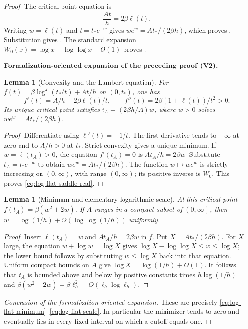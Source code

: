 \documentclass[11pt]{article}
\newtheorem{lemma}[theorem]{Lemma}
\newcommand{\formalisationparentid}{X}
\newenvironment{formalisationaddition}[1]{\par\medskip\begingroup\color{blue}\def\formalisationparentid{#1}\setcounter{formalizationsublemma}{0}\let\lemma\formalizationsublemma\let\endlemma\endformalizationsublemma
  \def\Eo{\mathcal E_h^\circ}\def\EE{\mathcal E_h}\def\phio{\phi_h^\circ}\def\phih{\phi_h}\def\Ho{H_h^{\rm atom}(v^\circ)}\def\Ha{H_h^{\rm atom}}\def\HL{H_h^{L}}\def\Dh{D_h}\def\Log{\operatorname{Log}}\def\ellh{\ell_h}\def\Gp{G_{p,h}}\def\Ast{A_{*,h}}\def\ahat{\widehat{\mathfrak a}_h}\def\ah{\mathfrak a_h}\def\rh{\widehat\rho_h}\def\deltah{\widehat\delta_h}\def\oldref##1{\textup{(##1)}}\def\interface##1{\par\noindent\textit{Analytical interface used here.} ##1\par}\def\finish{\par\noindent\textit{Conclusion of the formalization-oriented expansion.} }\par\noindent\textbf{Formalization-oriented expansion of the preceding proof (V2).}\par\smallskip
}{\par\endgroup\medskip
}
\begin{document}
\begin{proof}
The critical-point equation is
\[
 \frac{At}{h}=2\beta\ell(t).
\]
Writing $w=\ell(t)$ and $t=t_*e^{-w}$ gives
$we^w=At_*/(2\beta h)$, which proves
.  Substitution gives
.  The standard expansion
$W_0(x)=\log x-\log\log x+O(1)$ proves
.

\begin{formalisationaddition}{L2.7}
\begin{lemma}[Convexity and the Lambert equation]\label{sublemma:L2-7-stationary}
For $f(t)=\beta\log^2(t_*/t)+At/h$ on $(0,t_*)$, one has
\[
 f'(t)=A/h-2\beta\ell(t)/t,\qquad
 f''(t)=2\beta(1+\ell(t))/t^2>0.
\]
Its unique critical point satisfies $t_A=(2\beta h/A)w$, where
$w>0$ solves $we^w=At_*/(2\beta h)$.
\end{lemma}
\begin{proof}
Differentiate using $\ell'(t)=-1/t$. The first derivative tends to $-\infty$ at zero and to $A/h>0$ at $t_*$. Strict convexity gives a unique minimum. If $w=\ell(t_A)>0$, the equation $f'(t_A)=0$ is $At_A/h=2\beta w$. Substitute $t_A=t_*e^{-w}$ to obtain $we^w=At_*/(2\beta h)$. The function $w\mapsto we^w$ is strictly increasing on $(0,\infty)$, with range $(0,\infty)$; its positive inverse is $W_0$. This proves \eqref{eq:log-flat-saddle-real}.
\end{proof}

\begin{lemma}[Minimum and elementary logarithmic scale]\label{sublemma:L2-7-value-scale}
At this critical point $f(t_A)=\beta(w^2+2w)$. If $A$ ranges in a compact subset of $(0,\infty)$, then
$w=\log(1/h)+O(\log\log(1/h))$ uniformly.
\end{lemma}
\begin{proof}
Insert $\ell(t_A)=w$ and $At_A/h=2\beta w$ in $f$.
Put $X=At_*/(2\beta h)$. For $X$ large, the equation $w+\log w=\log X$ gives
$\log X-\log\log X\le w\le\log X$; the lower bound follows by substituting $w\le\log X$ back into that equation. Uniform compact bounds on $A$ give $\log X=\log(1/h)+O(1)$. It follows that $t_A$ is bounded above and below by positive constants times $h\log(1/h)$ and
$\beta(w^2+2w)=\beta\ell_h^2+O(\ell_h\log\ell_h)$.
\end{proof}
\finish These are precisely \eqref{eq:log-flat-minimum}--\eqref{eq:log-flat-scale}. In particular the minimizer tends to zero and eventually lies in every fixed interval on which a cutoff equals one.
\end{formalisationaddition}

\end{proof}
\end{document}
